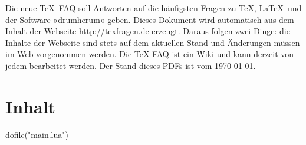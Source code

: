 \documentclass[a4paper,ngerman,fontsize=10bp]{scrartcl}
\begin{document}
\RaggedRight
\sloppy

Die neue \TeX\ FAQ soll Antworten auf die häufigsten Fragen zu \TeX, \LaTeX\ und der Software »drumherum« geben. Dieses Dokument wird automatisch aus dem Inhalt der Webseite \url{http://texfragen.de} erzeugt. Daraus folgen zwei Dinge: die Inhalte der Webseite sind stets auf dem aktuellen Stand und Änderungen müssen im Web vorgenommen werden. Die TeX FAQ ist ein Wiki und kann derzeit von jedem bearbeitet werden. Der Stand dieses PDFs ist vom \today.

\section{Inhalt}
\begin{luacode*}
dofile("main.lua")
\end{luacode*}
\end{document}
